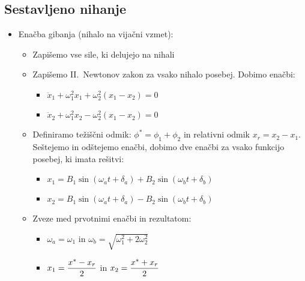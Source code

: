 \subsection{Sestavljeno nihanje}
\begin{itemize}
    \item Enačba gibanja (nihalo na vijačni vzmet):
    \begin{itemize}
        \item Zapišemo vse sile, ki delujejo na nihali
        \item Zapišemo II.\ Newtonov zakon za vsako nihalo posebej. Dobimo enačbi:
        \begin{itemize}
            \item \(\ddot{x}_1 + \omega_1^2 x_1 + \omega_2^2(x_1 - x_2) = 0\)
            \item \(\ddot{x}_2 + \omega_1^2x_2 - \omega_2^2(x_1 - x_2) = 0\)
        \end{itemize}
        \item Definiramo težiščni odmik: \(\phi^* = \phi_1 + \phi_2\) in relativni odmik \(x_r = x_2 - x_1\). Seštejemo in odštejemo enačbi, dobimo dve enačbi za vsako funkcijo posebej, ki imata rešitvi:
        \begin{itemize}
            \item \(x_1 = B_1 \sin(\omega_at + \delta_a) + B_2 \sin(\omega_bt + \delta_b)\)
            \item \(x_2 = B_1 \sin(\omega_at + \delta_a) - B_2 \sin(\omega_bt + \delta_b)\)
        \end{itemize}
        \item Zveze med prvotnimi enačbi in rezultatom:
        \begin{itemize}
            \item \(\omega_a = \omega_1\) in \(\omega_b = \sqrt{\omega_1^2 + 2\omega_2^2}\)
            \item \(\displaystyle x_1 = \frac{x^* - x_r}{2}\) in \(\displaystyle x_2 = \frac{x^* + x_r}{2}\)
        \end{itemize}
    \end{itemize}
\end{itemize}

\newpage
